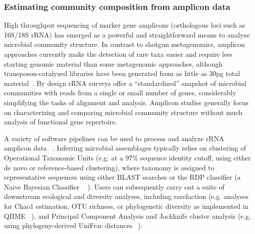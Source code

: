 \documentclass[10pt]{article}
\begin{document}
\subsubsection*{Estimating community composition from amplicon data}
High throughput sequencing of marker gene amplicons (orthologous loci such as 16S/18S rRNA) has emerged as a powerful and straightforward means to analyze microbial community structure.
In contrast to shotgun metagenomics, amplicon approaches currently make the detection of rare taxa easier and require less starting genomic material than some metagenomic approaches, although transposon-catalyzed libraries have been generated from as little as 30pg total material~\cite{Adey2010}.
By design rRNA surveys offer a ``standardized'' snapshot of microbial communities with reads from a single or small number of genes, considerably simplifying the tasks of alignment and analysis. 
Amplicon studies generally focus on characterizing and comparing microbial community structure without much analysis of functional gene repertoire. 

A variety of software pipelines can be used to process and analyze rRNA amplicon data ~\cite{Bik2012}. 
Inferring microbial assemblages typically relies on clustering of Operational Taxonomic Units (e.g. at a 97\% sequence identity cutoff, using either de novo or reference-based clustering), where taxonomy is assigned to representative sequences using either BLAST searches or the RDP classifier (a Naive Bayesian Classifier ~\cite{Wang2007} ).
Users can subsequently carry out a suite of downstream ecological and diversity analyses, including rarefaction (e.g. analyses for Chao1 estimation, OTU richness, or phylogenetic diversity as implemented in QIIME ~\cite{Caporaso2010}), and Principal Component Analysis and Jackknife cluster analysis (e.g. using phylogeny-derived UniFrac distances ~\cite{Lozupone2005}).
\end{document}
